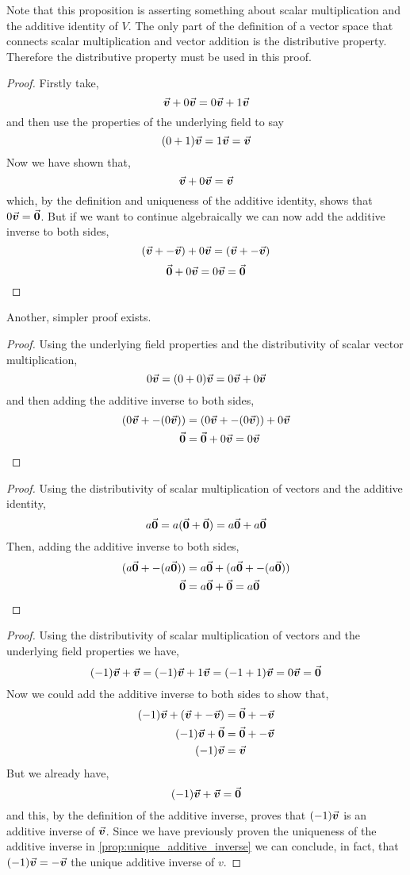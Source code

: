\documentclass[MathsNotesBase.tex]{subfiles}
\begin{document}
{		\bigskip
		Note that this proposition is asserting something about scalar multiplication and the additive identity of $V$. The only part of the definition of a vector space that connects scalar multiplication and vector addition is the distributive property. Therefore the distributive property must be used in this proof.
		\begin{proof}
			Firstly take,
			\[ \vec{\bm{v}} + 0\vec{\bm{v}} = 0\vec{\bm{v}} + 1\vec{\bm{v}} \]
			and then use the properties of the underlying field to say
			\[ (0 + 1)\vec{\bm{v}} = 1\vec{\bm{v}} = \vec{\bm{v}} \]
			Now we have shown that,
			\[ \vec{\bm{v}} + 0\vec{\bm{v}} = \vec{\bm{v}} \]
			which, by the definition and uniqueness of the additive identity, shows that $0\vec{\bm{v}} = \vec{\bm{0}}$. But if we want to continue algebraically we can now add the additive inverse to both sides,
			\[ (\vec{\bm{v}} + -\vec{\bm{v}}) + 0\vec{\bm{v}} = (\vec{\bm{v}} + -\vec{\bm{v}}) \]
			\[ \vec{\bm{0}} + 0\vec{\bm{v}} = 0\vec{\bm{v}} = \vec{\bm{0}} \qedhere\]
		\end{proof}
		Another, simpler proof exists. 
		\begin{proof}
			Using the underlying field properties and the distributivity of scalar vector multiplication,
			\[ 0\vec{\bm{v}} = (0 + 0)\vec{\bm{v}} = 0\vec{\bm{v}} + 0\vec{\bm{v}} \]
			and then adding the additive inverse to both sides,
			\begin{align*}
			(0\vec{\bm{v}} + -(0\vec{\bm{v}})) &= (0\vec{\bm{v}} + -(0\vec{\bm{v}})) + 0\vec{\bm{v}} \\
			\vec{\bm{0}} &= \vec{\bm{0}} + 0\vec{\bm{v}} = 0\vec{\bm{v}} \qedhere
			\end{align*}
		\end{proof}
		
		\bigskip
		\begin{proof}
			Using the distributivity of scalar multiplication of vectors and the additive identity,
			\[ a\vec{\bm{0}} = a(\vec{\bm{0}} + \vec{\bm{0}}) = a\vec{\bm{0}} + a\vec{\bm{0}} \]
			Then, adding the additive inverse to both sides,
			\begin{align*}
			(a\vec{\bm{0}} + -(a\vec{\bm{0}})) &= a\vec{\bm{0}} + (a\vec{\bm{0}} + -(a\vec{\bm{0}}))\\
			\vec{\bm{0}} &= a\vec{\bm{0}} + \vec{\bm{0}} = a\vec{\bm{0}} \qedhere
			\end{align*}
		\end{proof}
		
		\bigskip
		\begin{proof}
			Using the distributivity of scalar multiplication of vectors and the underlying field properties we have,
			\[ (-1)\vec{\bm{v}} + \vec{\bm{v}} = (-1)\vec{\bm{v}} + 1\vec{\bm{v}} = (-1 + 1)\vec{\bm{v}} = 0\vec{\bm{v}} = \vec{\bm{0}} \]
			Now we could add the additive inverse to both sides to show that,
			\begin{align*} 
			(-1)\vec{\bm{v}} + (\vec{\bm{v}} + -\vec{\bm{v}}) &= \vec{\bm{0}} + -\vec{\bm{v}} \\
			(-1)\vec{\bm{v}} + \vec{\bm{0}} &= \vec{\bm{0}} + -\vec{\bm{v}} \\
			(-1)\vec{\bm{v}} &= \vec{\bm{v}} \qedhere
			\end{align*}
			But we already have,
			\[ (-1)\vec{\bm{v}} + \vec{\bm{v}} =\vec{\bm{0}} \]
			and this, by the definition of the additive inverse, proves that $(-1)\vec{\bm{v}}$ is an additive inverse of $\vec{\bm{v}}$. Since we have previously proven the uniqueness of the additive inverse in \autoref{prop:unique_additive_inverse} we can conclude, in fact, that $(-1)\vec{\bm{v}} = -\vec{\bm{v}}$ the unique additive inverse of $v$.
		\end{proof}
	
}
\end{document}
